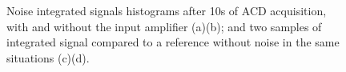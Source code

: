 \begin{figure}
    \centering
    \caption{Noise integrated signals histograms after 10s of ACD acquisition, with and without the input amplifier (a)(b); and two samples of integrated signal compared to a reference without noise in the same situations (c)(d).}
    \label{fig:before_after_correction}
\end{figure}

